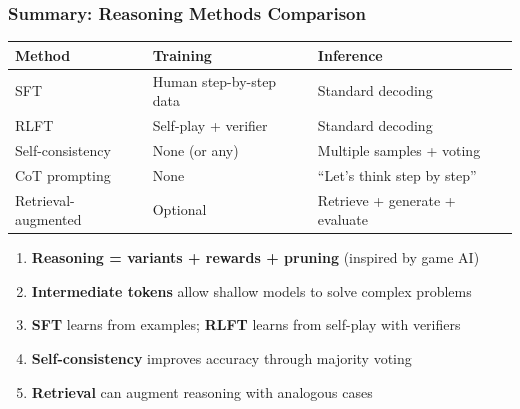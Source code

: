 \bigseparator

\subsubsection{Summary: Reasoning Methods Comparison}

\begin{center}
\renewcommand{\arraystretch}{1.3}
\begin{tabular}{@{} l p{4cm} p{4cm} @{}}
\toprule
\textbf{Method} & \textbf{Training} & \textbf{Inference} \\
\midrule
SFT & Human step-by-step data & Standard decoding \\
RLFT & Self-play + verifier & Standard decoding \\
Self-consistency & None (or any) & Multiple samples + voting \\
CoT prompting & None & ``Let's think step by step'' \\
Retrieval-augmented & Optional & Retrieve + generate + evaluate \\
\bottomrule
\end{tabular}
\end{center}

\begin{thmbox}
\begin{enumerate}
  \item \textbf{Reasoning = variants + rewards + pruning} (inspired by game AI)
  \item \textbf{Intermediate tokens} allow shallow models to solve complex problems
  \item \textbf{SFT} learns from examples; \textbf{RLFT} learns from self-play with verifiers
  \item \textbf{Self-consistency} improves accuracy through majority voting
  \item \textbf{Retrieval} can augment reasoning with analogous cases
\end{enumerate}
\end{thmbox}

